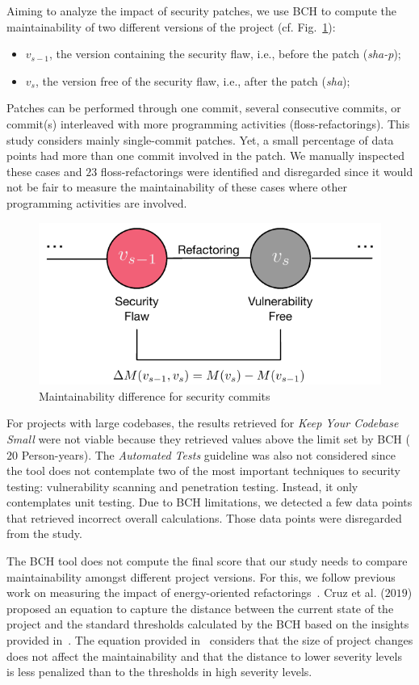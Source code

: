 \documentclass[smallextended]{svjour3}       %
\begin{document}
Aiming to analyze the impact of security patches, we use BCH to compute the
maintainability of two different versions of the project (cf. Fig.~\ref{fig:commit}):

\begin{itemize}
	\item $v_{s-1}$, the version containing the security flaw, i.e., before the
	patch (\emph{sha-p});
	\item $v_{s}$, the version free of the security flaw, i.e., after the
	patch (\emph{sha});
\end{itemize}

Patches can be performed through one commit, several consecutive commits, or 
commit(s) interleaved with more programming activities (floss-refactorings). This study considers mainly single-commit 
patches. Yet, a small percentage of data points had more than one commit 
involved in the patch. We manually inspected these cases and $23$ 
floss-refactorings were identified and disregarded since it would not
be fair to measure the maintainability of these cases where other
programming activities are involved.

\begin{figure}[h]
 	\centering 	
	\includegraphics[width=0.6\linewidth]{figures/commit.pdf}
 	\caption{Maintainability difference for security commits}
	\label{fig:commit}
\end{figure}

For projects with large codebases, the results retrieved for \emph{Keep Your 
Codebase Small} were not viable because they retrieved values above the limit 
set by BCH ($20$ Person-years). The \emph{Automated Tests} guideline was also 
not considered since the tool does not contemplate two
of the most important techniques to security testing: vulnerability scanning
and penetration testing. Instead, it only contemplates unit 
testing. Due to BCH limitations, we detected a few data points
that retrieved incorrect overall calculations. 
Those data points were disregarded from the study.

The BCH tool does not compute the final score that our study needs to compare
maintainability amongst different project versions. For this, we follow previous 
work on measuring the impact of energy-oriented 
refactorings~\cite{8919169}. Cruz et al. ($2019$) proposed an 
equation to capture the distance between the current state of the project and
the standard thresholds calculated by the BCH based on the insights provided 
in~\cite{Olivari:2018}. The equation provided in~\cite{8919169} 
considers that the size of project changes does not affect the maintainability 
and that the distance to lower severity levels is less penalized than to the
thresholds in high severity levels.
\end{document}
